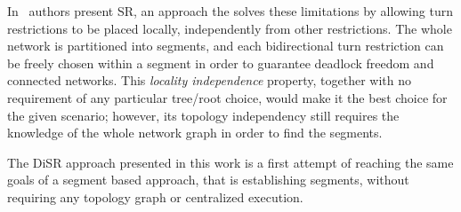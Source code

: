 In~\cite{mejia_ipdps06} authors present SR, an approach the solves these
limitations by allowing turn restrictions to be placed locally,
independently from other restrictions. The whole network is
partitioned into segments, and each bidirectional turn
restriction can be freely chosen within a segment in order to guarantee
deadlock freedom and connected networks. This \emph{locality
independence} property, together with no requirement of any particular tree/root
choice, would make it the best choice for the given scenario;
however, its topology independency still requires the knowledge of the
whole network graph in order to find the segments. 

The DiSR approach presented in this work is a first attempt of
reaching the same goals of a segment based approach, that is
establishing segments, without requiring any topology graph or
centralized execution. 




